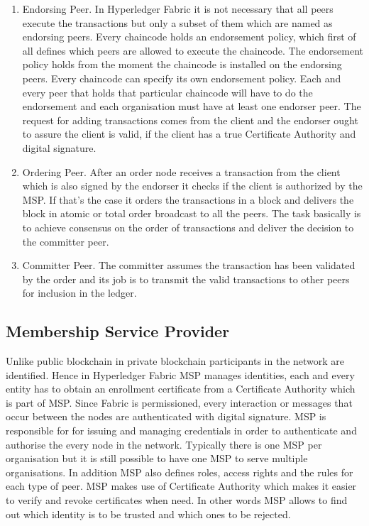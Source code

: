 \begin{enumerate}
\item Endorsing Peer. In Hyperledger Fabric it is not necessary that all peers execute the transactions but only a subset of them which are named as endorsing peers. Every chaincode holds an endorsement policy, which first of all defines which peers are allowed to execute the chaincode. The endorsement policy holds from the moment the chaincode is installed on the endorsing peers. Every chaincode can specify its own endorsement policy. Each and every peer that holds that particular chaincode will have to do the endorsement and each organisation must have at least one endorser peer. The request for adding transactions comes from the client and the endorser ought to assure the client is valid, if the client has a true Certificate Authority and digital signature. 


\item Ordering Peer. 
After an order node receives a transaction from the client which is also signed by the endorser it checks if the client is authorized by the MSP. If that's the case it orders the transactions in a block and delivers the block in atomic or total order broadcast to all the peers. The task basically is to achieve consensus on the order of transactions and deliver the decision to the committer peer. 
\item Committer Peer. The committer assumes the transaction has been validated by the order and its job is to transmit the valid transactions to other peers for inclusion in the ledger. 
\end{enumerate}



\subsection{Membership Service Provider}
Unlike public blockchain in private blockchain participants in the network are identified. Hence in Hyperledger Fabric 
MSP manages identities, each  and every entity has to obtain an enrollment certificate from a Certificate Authority which is part of MSP. Since Fabric is permissioned, every interaction or messages that occur between the nodes are authenticated with digital signature. MSP is responsible for for issuing and managing credentials in order to authenticate and authorise the every node in the network. Typically there is one MSP per organisation but it is still possible to have one MSP to serve multiple organisations. In addition MSP also defines roles, access rights and the rules for each type of peer. MSP makes use of Certificate Authority which makes it easier to verify and revoke certificates when need. In other words MSP allows to find out which identity is to be trusted and which ones to be rejected. 

